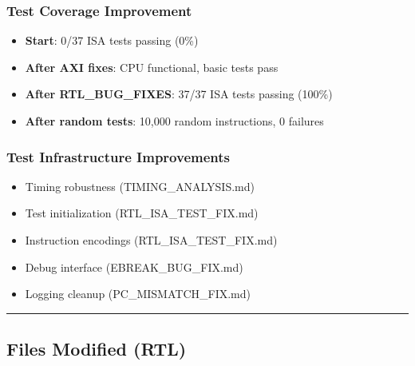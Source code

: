\subsubsection{Test Coverage Improvement}\label{cr:fix:fixes-index:test-coverage-improvement}

\begin{record}

\begin{itemize}
\tightlist
\item
  \textbf{Start}: 0/37 ISA tests passing (0\%)
\item
  \textbf{After AXI fixes}: CPU functional, basic tests pass
\item
  \textbf{After RTL\_\allowbreak{}BUG\_\allowbreak{}FIXES}: 37/37 ISA
  tests passing (100\%) \ok{}
\item
  \textbf{After random tests}: 10,000 random instructions, 0 failures
  \ok{}
\end{itemize}

\end{record}

\subsubsection{Test Infrastructure Improvements}\label{cr:fix:fixes-index:test-infrastructure-improvements}

\begin{record}

\begin{itemize}
\tightlist
\item
  \ok{} Timing robustness (TIMING\_\allowbreak{}ANALYSIS.md)
\item
  \ok{} Test initialization
  (RTL\_\allowbreak{}ISA\_\allowbreak{}TEST\_\allowbreak{}FIX.md)
\item
  \ok{} Instruction encodings
  (RTL\_\allowbreak{}ISA\_\allowbreak{}TEST\_\allowbreak{}FIX.md)
\item
  \ok{} Debug interface (EBREAK\_\allowbreak{}BUG\_\allowbreak{}FIX.md)
\item
  \ok{} Logging cleanup (PC\_\allowbreak{}MISMATCH\_\allowbreak{}FIX.md)
\end{itemize}

\begin{center}\rule{0.5\linewidth}{0.5pt}\end{center}

\end{record}

\subsection{Files Modified (RTL)}\label{cr:fix:fixes-index:files-modified-rtl}

